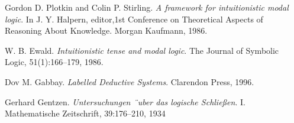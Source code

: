 \documentclass[twoside]{aiml18}
\begin{document}
\begin{thebibliography}{4}
	
	
	
	
	
	
	
	Gordon D. Plotkin and Colin P. Stirling. \emph{A framework for intuitionistic modal logic}. In J. Y. Halpern, editor,1st Conference on Theoretical Aspects of Reasoning About Knowledge.
	Morgan Kaufmann, 1986.
	
	W. B. Ewald. \emph{Intuitionistic tense and modal logic}. The Journal of Symbolic Logic, 51(1):166–179, 1986.
	
	Dov M. Gabbay. \emph{Labelled Deductive Systems}. Clarendon Press, 1996.
	
	
	
	Gerhard Gentzen. \emph{Untersuchungen ¨uber das logische Schließen}. I. Mathematische
Zeitschrift, 39:176–210, 1934

\end{thebibliography}
\end{document}
